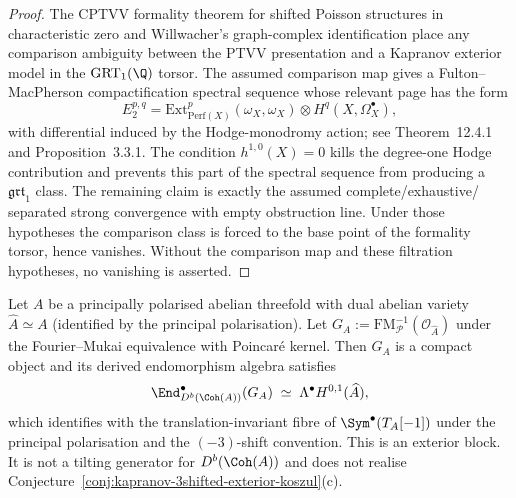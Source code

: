 \begin{proof}
The CPTVV formality theorem for shifted Poisson structures in
characteristic zero \cite{CPTVV2017} and Willwacher's graph-complex
identification \cite{Willwacher2015} place any comparison ambiguity
between the PTVV presentation and a Kapranov exterior model in the
$\mathrm{GRT}_1(\Q)$ torsor. The assumed comparison map gives a
Fulton--MacPherson compactification spectral sequence whose relevant
page has the form
\[
E_2^{p,q} = \mathrm{Ext}^p_{\mathrm{Perf}(X)}(\omega_X, \omega_X)
\otimes H^q(X, \Omega_X^\bullet),
\]
with differential induced by the Hodge-monodromy action; see
\cite{CostelloGwilliamFA2} Theorem~12.4.1 and
\cite{Kontsevich1999LMP} Proposition~3.3.1. The condition
$h^{1,0}(X)=0$ kills the degree-one Hodge contribution and prevents this
part of the spectral sequence from producing a $\mathfrak{grt}_1$
class. The remaining claim is exactly the assumed complete/exhaustive/
separated strong convergence with empty obstruction line. Under those
hypotheses the comparison class is forced to the base point of the
formality torsor, hence vanishes. Without the comparison map and these
filtration hypotheses, no vanishing is asserted.
\end{proof}

\begin{proposition}
\label{prop:cy-b-d3-abelian-threefold}
Let $A$ be a principally polarised abelian threefold with dual abelian
variety $\widehat{A} \simeq A$ (identified by the principal polarisation).
Let
$G_A := \mathrm{FM}_{\mathcal{P}}^{-1}(\mathcal{O}_{\widehat A})$
under the Fourier--Mukai equivalence with Poincar\'e kernel. Then
$G_A$ is a compact object and its derived endomorphism algebra satisfies
\[
\End^\bullet_{D^b(\Coh(A))}(G_A) \;\simeq\;
\Lambda^\bullet H^{0,1}(\widehat A),
\]
which identifies with the translation-invariant fibre of
$\Sym^\bullet(T_A[-1])$ under the principal polarisation and the
$(-3)$-shift convention. This is an exterior block. It is not a
tilting generator for $D^b(\Coh(A))$ and does not realise
Conjecture~\ref{conj:kapranov-3shifted-exterior-koszul}(c).
\end{proposition}

